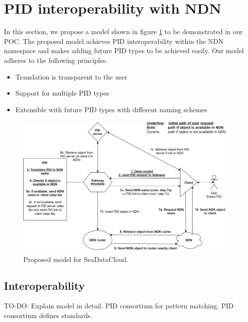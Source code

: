 \section{PID interoperability with NDN}

In this section, we propose a model shown in figure \ref{fig:sdc_model} to be demonstrated in our POC. The proposed model achieves PID interoperability within the NDN namespace and makes adding future PID types to be achieved easily.
\newline
\newline
Our model adheres to the following principles.

\begin{itemize}
    \item{Translation is transparent to the user}
    \item{Support for multiple PID types}
    \item{Extensible with future PID types with different naming schemes}
\end{itemize}

\begin{figure}[H]
\centering
\includegraphics[scale=0.25]{Images/PIDNDN_edit_final_5.png}
\caption{Proposed model for SeaDataCloud.}
\label{fig:sdc_model}
\end{figure}

\subsection{Interoperability}

TO-DO:
\newline
Explain model in detail.
PID consortium for pattern matching. PID consortium defines standards.

